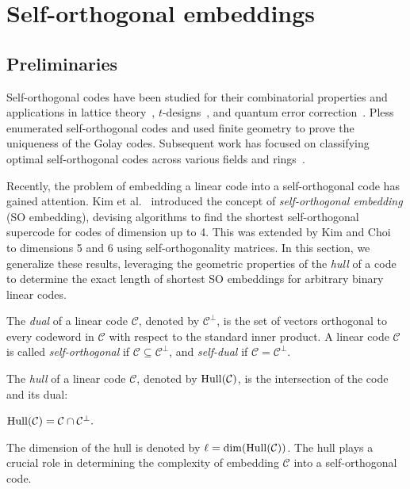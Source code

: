 \section{Self-orthogonal embeddings}\label{ch:so}

\subsection{Preliminaries}

Self-orthogonal codes have been studied for their combinatorial properties and applications in lattice theory~\cite{Harada2009, Bouyuklieva2013}, $t$-designs~\cite{Hadara2004, Bachoc2004}, and quantum error correction~\cite{Calderbank1998, Kim2002:2}. Pless~\cite{Pless1968} enumerated self-orthogonal codes and used finite geometry to prove the uniqueness of the Golay codes. Subsequent work has focused on classifying optimal self-orthogonal codes across various fields and rings~\cite{Pless1972, Huffman2005, Boukllieve2006}.

Recently, the problem of embedding a linear code into a self-orthogonal code has gained attention. Kim et al.~\cite{Kim2021} introduced the concept of \textit{self-orthogonal embedding} (SO embedding), devising algorithms to find the shortest self-orthogonal supercode for codes of dimension up to 4. This was extended by Kim and Choi~\cite{Kim2022} to dimensions 5 and 6 using self-orthogonality matrices. In this section, we generalize these results, leveraging the geometric properties of the \textit{hull} of a code to determine the exact length of shortest SO embeddings for arbitrary binary linear codes.

\begin{definition}
The \textit{dual} of a linear code $\mathcal{C}$, denoted by $\mathcal{C}^\perp$, is the set of vectors orthogonal to every codeword in $\mathcal{C}$ with respect to the standard inner product. A linear code $\mathcal{C}$ is called \textit{self-orthogonal} if $\mathcal{C} \subseteq \mathcal{C}^\perp$, and \textit{self-dual} if $\mathcal{C} = \mathcal{C}^\perp$.
\end{definition}

\begin{definition}[Hull]
The \textit{hull} of a linear code $\mathcal{C}$, denoted by $\operatorname{Hull}(\mathcal{C})$, is the intersection of the code and its dual:
\begin{center}
$\operatorname{Hull}(\mathcal{C}) = \mathcal{C} \cap \mathcal{C}^\perp.$
\end{center}
The dimension of the hull is denoted by $\ell = \dim(\operatorname{Hull}(\mathcal{C}))$. The hull plays a crucial role in determining the complexity of embedding $\mathcal{C}$ into a self-orthogonal code.
\end{definition}

